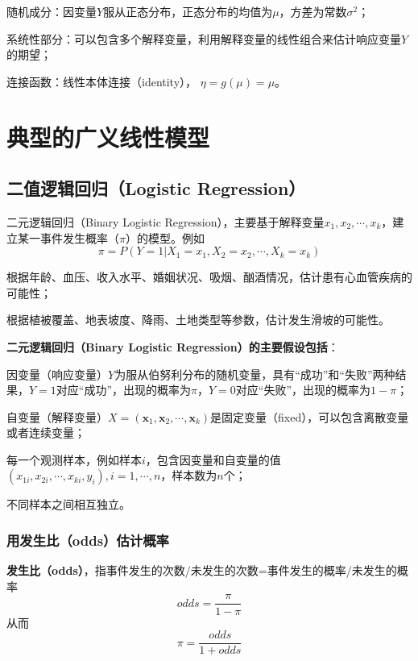 随机成分：因变量$Y$服从正态分布，正态分布的均值为$\mu$，方差为常数$\sigma^2$；

系统性部分：可以包含多个解释变量，利用解释变量的线性组合来估计响应变量$Y$的期望；

连接函数：线性本体连接（identity）， $\eta = g(\mu) = \mu$。

\section{典型的广义线性模型}

\subsection{二值逻辑回归（Logistic Regression）}

二元逻辑回归（Binary Logistic Regression），主要基于解释变量$x_1,x_2,\cdots,x_k$，建立某一事件发生概率（$\pi$）的模型。例如
\begin{equation}
    \pi = P(Y=1|X_1=x_1,X_2=x_2,\cdots,X_k=x_k)
\end{equation}

\begin{note}
    根据年龄、血压、收入水平、婚姻状况、吸烟、酗酒情况，估计患有心血管疾病的可能性；

    根据植被覆盖、地表坡度、降雨、土地类型等参数，估计发生滑坡的可能性。
\end{note}

\textbf{二元逻辑回归（Binary Logistic Regression）的主要假设包括}：

因变量（响应变量）$Y$为服从伯努利分布的随机变量，具有“成功”和“失败”两种结果，$Y=1$对应“成功”，出现的概率为$\pi$，$Y=0$对应“失败”，出现的概率为$1-\pi$；

自变量（解释变量）$X= (\mathbf{x}_1,\mathbf{x}_2,\cdots,\mathbf{x}_k)$是固定变量（fixed），可以包含离散变量或者连续变量；

每一个观测样本，例如样本$i$，包含因变量和自变量的值$(x_{1i},x_{2i},\cdots,x_{ki} ,y_i),i=1,\cdots, n$，样本数为$n$个；

不同样本之间相互独立。

\subsubsection{用发生比（odds）估计概率}

\textbf{发生比（odds）}，指事件发生的次数/未发生的次数=事件发生的概率/未发生的概率
\begin{equation}
    odds = \frac{\pi}{1-\pi}
\end{equation}
从而
\begin{equation}
    \pi = \frac{odds}{1+odds}
\end{equation}

